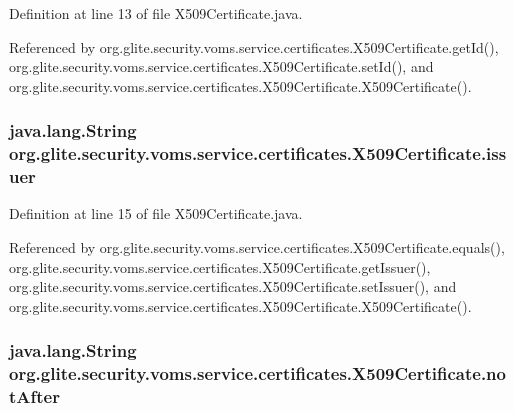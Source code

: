 Definition at line 13 of file X509Certificate.java.



Referenced by org.glite.security.voms.service.certificates.X509Certificate.getId(), org.glite.security.voms.service.certificates.X509Certificate.setId(), and org.glite.security.voms.service.certificates.X509Certificate.X509Certificate().

\hypertarget{classorg_1_1glite_1_1security_1_1voms_1_1service_1_1certificates_1_1X509Certificate_a77330c6d98cf740cd9bc094b386c4247}{
\subsubsection[{issuer}]{\setlength{\rightskip}{0pt plus 5cm}java.lang.String {\bf org.glite.security.voms.service.certificates.X509Certificate.issuer}}}
\label{classorg_1_1glite_1_1security_1_1voms_1_1service_1_1certificates_1_1X509Certificate_a77330c6d98cf740cd9bc094b386c4247}


Definition at line 15 of file X509Certificate.java.



Referenced by org.glite.security.voms.service.certificates.X509Certificate.equals(), org.glite.security.voms.service.certificates.X509Certificate.getIssuer(), org.glite.security.voms.service.certificates.X509Certificate.setIssuer(), and org.glite.security.voms.service.certificates.X509Certificate.X509Certificate().

\hypertarget{classorg_1_1glite_1_1security_1_1voms_1_1service_1_1certificates_1_1X509Certificate_aef72b7697d657017ee1ab929089cfd0a}{
\subsubsection[{notAfter}]{\setlength{\rightskip}{0pt plus 5cm}java.lang.String {\bf org.glite.security.voms.service.certificates.X509Certificate.notAfter}}}
\label{classorg_1_1glite_1_1security_1_1voms_1_1service_1_1certificates_1_1X509Certificate_aef72b7697d657017ee1ab929089cfd0a}


